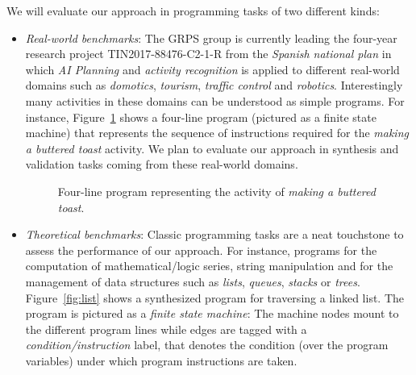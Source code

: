 \documentclass[10pt,a4paper]{paper}
\begin{document}
We will evaluate our approach in programming tasks of two different kinds:
\begin{itemize}
\item {\em Real-world benchmarks}: The GRPS group is currently leading the four-year research project TIN2017-88476-C2-1-R from the {\em Spanish national plan} in which {\em AI Planning} and {\em activity recognition} is applied to different real-world domains such as {\em domotics}, {\em tourism}, {\em traffic control} and {\em robotics}. Interestingly many activities in these domains can be understood as simple programs. For instance, Figure~\ref{fig:activity} shows a four-line program (pictured as a finite state machine) that represents the sequence of instructions required for the {\em making a buttered toast} activity. We plan to evaluate our approach in synthesis and validation tasks coming from these real-world domains. 

\begin{figure}[hbt!]
\begin{center}
\end{center}
\caption{\small Four-line program representing the activity of {\em making a buttered toast}.}
\label{fig:activity}
\end{figure}


\item {\em Theoretical benchmarks}: Classic programming tasks are a neat touchstone to assess the performance of our approach. For instance, programs for the computation of mathematical/logic series, string manipulation and for the management of data structures such as {\em lists}, {\em queues}, {\em stacks} or {\em trees}. Figure~\ref{fig:list} shows a synthesized program for traversing a linked list. The program is pictured as a {\em finite state machine}: The machine nodes mount to the different program lines while edges are tagged with a {\em condition/instruction} label, that denotes the condition (over the program variables) under which program instructions are taken.  
\end{itemize}
\end{document}
